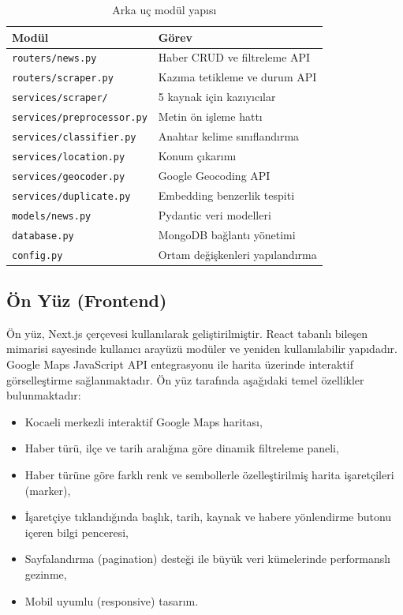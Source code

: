 \documentclass[conference]{IEEEtran}
\begin{document}
\begin{table}[H]
\centering
\caption{Arka uç modül yapısı}
\label{tab:moduller}
\begin{tabular}{@{}ll@{}}
\toprule
\textbf{Modül} & \textbf{Görev} \\
\midrule
\texttt{routers/news.py} & Haber CRUD ve filtreleme API \\
\texttt{routers/scraper.py} & Kazıma tetikleme ve durum API \\
\texttt{services/scraper/} & 5 kaynak için kazıyıcılar \\
\texttt{services/preprocessor.py} & Metin ön işleme hattı \\
\texttt{services/classifier.py} & Anahtar kelime sınıflandırma \\
\texttt{services/location.py} & Konum çıkarımı \\
\texttt{services/geocoder.py} & Google Geocoding API \\
\texttt{services/duplicate.py} & Embedding benzerlik tespiti \\
\texttt{models/news.py} & Pydantic veri modelleri \\
\texttt{database.py} & MongoDB bağlantı yönetimi \\
\texttt{config.py} & Ortam değişkenleri yapılandırma \\
\bottomrule
\end{tabular}
\end{table}

\subsection{Ön Yüz (Frontend)}

Ön yüz, Next.js çerçevesi kullanılarak geliştirilmiştir. React tabanlı bileşen mimarisi sayesinde kullanıcı arayüzü modüler ve yeniden kullanılabilir yapıdadır. Google Maps JavaScript API entegrasyonu ile harita üzerinde interaktif görselleştirme sağlanmaktadır. Ön yüz tarafında aşağıdaki temel özellikler bulunmaktadır:

\begin{itemize}[leftmargin=*]
    \item Kocaeli merkezli interaktif Google Maps haritası,
    \item Haber türü, ilçe ve tarih aralığına göre dinamik filtreleme paneli,
    \item Haber türüne göre farklı renk ve sembollerle özelleştirilmiş harita işaretçileri (marker),
    \item İşaretçiye tıklandığında başlık, tarih, kaynak ve habere yönlendirme butonu içeren bilgi penceresi,
    \item Sayfalandırma (pagination) desteği ile büyük veri kümelerinde performanslı gezinme,
    \item Mobil uyumlu (responsive) tasarım.
\end{itemize}
\end{document}
